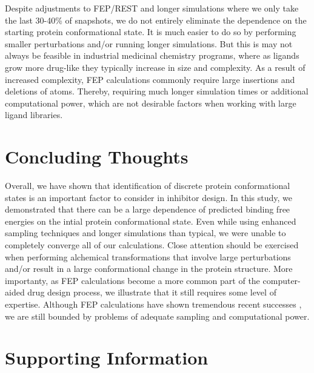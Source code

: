 \documentclass{article}
\begin{document}
Despite adjustments to FEP/REST and longer simulations where we only take the last 30-40\% of snapshots, we do not entirely eliminate the dependence on the starting protein conformational state.
It is much easier to do so by performing smaller perturbations and/or running longer simulations.
But this is may not always be feasible in industrial medicinal chemistry programs, where as ligands grow more drug-like they typically increase in size and complexity.
As a result of increased complexity, FEP calculations commonly require large insertions and deletions of atoms.
Thereby, requiring much longer simulation times or additional computational power, which are not desirable factors when working with large ligand libraries.

\section{Concluding Thoughts}
Overall, we have shown that identification of discrete protein conformational states is an important factor to consider in inhibitor design.
In this study, we demonstrated that there can be a large dependence of predicted binding free energies on the intial protein conformational state.
Even while using enhanced sampling techniques and longer simulations than typical, we were unable to completely converge all of our calculations.
Close attention should be exercised when performing alchemical transformations that involve large perturbations and/or result in a large conformational change in the protein structure.
More importanty, as FEP calculations become a more common part of the computer-aided drug design process, we illustrate that it still requires some level of expertise.
Although FEP calculations have shown tremendous recent successes \cite{FEPplus}, we are still bounded by problems of adequate sampling and computational power.

\section{Supporting Information}   
\end{document}

